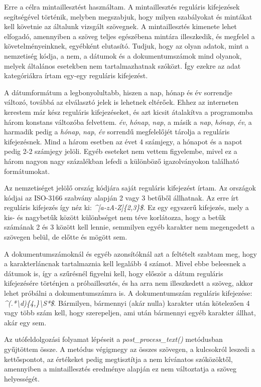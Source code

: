 \documentclass[12pt]{report}
\begin{document}
Erre a célra mintaillesztést használtam. A mintaillesztés reguláris kifejezések segítségével történik, melyben megszabjuk, hogy milyen szabályokat és mintákat kell követnie az általunk vizsgált szövegnek. A mintaillesztés kimenete lehet elfogadó, amennyiben a szöveg teljes egészébena mintára illeszkedik, és megfelel a követelményeinknek, egyébként elutasító.
Tudjuk, hogy az olyan adatok, mint a nemzetiség kódja, a nem, a dátumok és a dokumentumszámok mind olyanok, melyek általános esetekben nem tartalmazhatnak szóközt. Így ezekre az adat kategóriákra írtam egy-egy reguláris kifejezést.

A dátumformátum a legbonyolultabb, hiszen a nap, hónap és év sorrendje változó, továbbá az elválasztó jelek is lehetnek eltérőek. Ehhez az interneten kerestem már kész reguláris kifejezéseket, \cite{date_regex} és azt kicsit átalakítva a programomba három konstans változóba felvettem. \emph{év}, \emph{hónap}, \emph{nap}, a másik a \emph{nap}, \emph{hónap}, \emph{év}, a harmadik pedig a \emph{hónap}, \emph{nap}, \emph{év} sorrendű megfelelőjét tárolja a reguláris kifejezésnek. Mind a három esetben az évet 4 számjegy, a hónapot és a napot pedig 2-2 számjegy jelöli. Egyéb eseteket nem vettem figyelembe, mivel ez a három nagyon nagy százalékban lefedi a különböző igazolványokon található formátumokat.

Az nemzetiséget jelölő ország kódjára saját reguláris kifejezést írtam. Az országok kódjai az ISO-3166 szabvány alapján 2 vagy 3 betűből állhatnak. \cite{country_codes} Az erre írt reguláris kifejezés így néz ki: \emph{\textasciicircum[a-zA-Z]\{2,3\}\$}. Ez egy egyszerű kifejezés, mely a kis- és nagybetűk között különbséget nem téve korlátozza, hogy a betűk számának 2 és 3 között kell lennie, semmilyen egyéb karakter nem megengedett a szövegen belül, de előtte és mögött sem.

A dokumentumszámoknál és egyéb azonsítóknál azt a feltételt szabtam meg, hogy a karakterláncnak tartalmaznia kell legalább 4 számot. Mivel ebbe beleesnek a dátumok is, így a szűrésnél figyelni kell, hogy először a dátum reguláris kifejezésére történjen a próbaillesztés, és ha arra nem illeszkedett a szöveg, akkor lehet próbálni a dokumentumszámra is. A dokumentumszám reguláris kifejezése: \emph{\textasciicircum(.*\textbackslash d)\{4,\}\textbackslash S*\$}. Bármilyen, bármennyi (akár nulla) karakter után kötelezően 4 vagy több szám kell, hogy szerepeljen, ami után bármennyi egyéb karakter állhat, akár egy sem.

Az utófeldolgozási folyamat lépéseit a \emph{post\_process\_text()} metódusban gyűjtöttem össze. A metódus végigmegy az összes szövegen, a kulcsokról leszedi a kettőspontot, az értékeket pedig megtisztítja a nem kívánatos szóközöktől, amennyiben a mintaillesztés eredménye alapján ez nem változtatja a szöveg helyességét.
\end{document}
